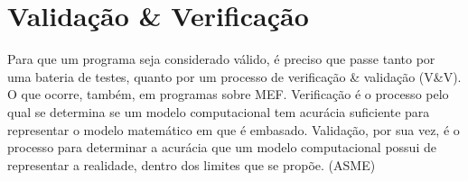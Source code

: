 \chapter{Validação \& Verificação}

Para que um programa seja considerado válido, é preciso que passe tanto por uma bateria de testes, quanto por um processo de verificação \& validação (V\&V). O que ocorre, também, em programas sobre MEF.
Verificação é o processo pelo qual se determina se um modelo computacional tem acurácia suficiente para representar o modelo matemático em que é embasado. Validação, por sua vez, é o processo para determinar a acurácia que um modelo computacional possui de representar a realidade, dentro dos limites que se propõe. (ASME)

